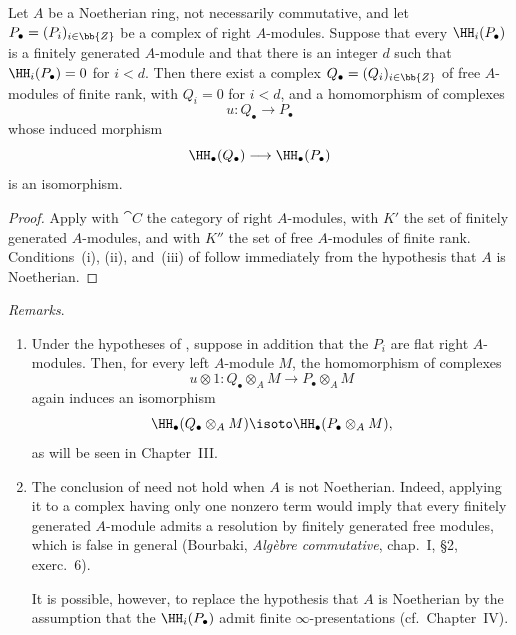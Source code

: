 \begin{corollary}[11.9.2]
\label{0.11.9.2}
Let $A$ be a Noetherian ring, not necessarily commutative, and let
$P_\bullet=(P_i)_{i\in\bb{Z}}$ be a complex of right $A$-modules.
Suppose that every $\HH_i(P_\bullet)$ is a finitely generated
$A$-module and that there is an integer $d$ such that
$\HH_i(P_\bullet)=0$ for $i<d$.
Then there exist a complex $Q_\bullet=(Q_i)_{i\in\bb{Z}}$ of free
$A$-modules of finite rank, with $Q_i=0$ for $i<d$, and a homomorphism
of complexes
\[
  u:Q_\bullet\longrightarrow P_\bullet
\]
whose induced morphism
\[
  \HH_\bullet(Q_\bullet)\longrightarrow\HH_\bullet(P_\bullet)
\]
is an isomorphism.
\end{corollary}

\begin{proof}
Apply  with $\cat{C}$ the category of right
$A$-modules, with $K'$ the set of finitely generated $A$-modules, and
with $K''$ the set of free $A$-modules of finite rank.
Conditions~(i), (ii), and~(iii) of  follow immediately
from the hypothesis that $A$ is Noetherian.
\end{proof}

\begin{env}[11.9.3]
\label{0.11.9.3}
\emph{Remarks}.
\begin{enumerate}
  \item[{\rm(i)}]
  Under the hypotheses of , suppose in addition that the
  $P_i$ are flat right $A$-modules.
  Then, for every left $A$-module $M$, the homomorphism of complexes
  \[
    u\otimes 1:
    Q_\bullet\otimes_A M
    \longrightarrow
    P_\bullet\otimes_A M
  \]
  again induces an isomorphism
  \[
    \HH_\bullet(Q_\bullet\otimes_A M)
    \isoto
    \HH_\bullet(P_\bullet\otimes_A M),
  \]
  as will be seen in Chapter~III.

  \item[{\rm(ii)}]
  The conclusion of  need not hold when $A$ is not
  Noetherian.
  Indeed, applying it to a complex having only one nonzero term would
  imply that every finitely generated $A$-module admits a resolution by
  finitely generated free modules, which is false in general
  (Bourbaki, \emph{Alg\`ebre commutative}, chap.~I, \S2, exerc.~6).

  It is possible, however, to replace the hypothesis that $A$ is
  Noetherian by the assumption that the $\HH_i(P_\bullet)$ admit finite
  $\infty$-presentations (cf.\ Chapter~IV).
\end{enumerate}
\end{env}

